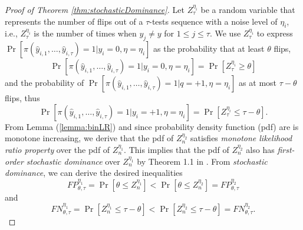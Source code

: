 \begin{proof}[Proof of Theorem \ref{thm:stochasticDominance}]
Let $Z_\tau^{\eta_i}$ be a random variable 
that represents the number of flips out of a $\tau$-tests sequence 
with a noise level of $\eta_i$,
i.e., $Z_\tau^{\eta_i}$ is the number of times 
when $y_j\ne y$ for $1\leq j \leq \tau$. 
We use $Z_\tau^{\eta_i}$ to express $\Pr[\pi(\hat{y}_{i,1},\dots,\hat{y}_{i,\tau})=1|y_i=0,\eta=\eta_i]$ as the probability that at least $\theta$ flips,
\[
\Pr[\pi(\hat{y}_{i,1},\dots,\hat{y}_{i,\tau})=1|y_i=0,\eta=\eta_i]=
\Pr[Z_\tau^{\eta_i}\geq \theta]
\]
and the probability of $\Pr[\pi(\hat{y}_{i,1},\dots,\hat{y}_{i,\tau})=1|q=+1,\eta=\eta_i]$ as at most $\tau-\theta$ flips, thus 
\[
\Pr[\pi(\hat{y}_{i,1},\dots,\hat{y}_{i,\tau})=1|y_i=+1,\eta=\eta_i]=\Pr[Z_\tau^{\eta_i}\leq \tau- \theta].
\]
From Lemma (\ref{lemma:binLR}) and since  probability density function (pdf) are is monotone increasing, 
we derive that the pdf of $Z_n^{\eta_2}$ 
satisfies \emph{monotone likelihood ratio property} 
over the pdf of $Z_n^{\eta_1}$. 
This implies that the pdf of $Z_n^{\eta_2}$ 
also has \emph{first-order stochastic dominance} over $Z_n^{\eta_1}$ 
by Theorem 1.1 in \cite{Whitt1980Uniform}. 
From \emph{stochastic dominance}, 
we can derive the desired inequalities 
\begin{equation*}
FP_{\theta,\tau}^{\eta_1}=\Pr[\theta\leq Z_n^{\eta_1}]<\Pr[ \theta \leq Z_n^{\eta_2}]
=FP_{\theta,\tau}^{\eta_2}
\end{equation*}
and
\begin{equation*}
FN_{\theta,\tau}^{\eta_1}=\Pr[Z_n^{\eta_1}\leq \tau- \theta]<\Pr[Z_n^{\eta_2}\leq \tau- \theta]=FN_{\theta,\tau}^{\eta_2}.
\end{equation*}
\end{proof}